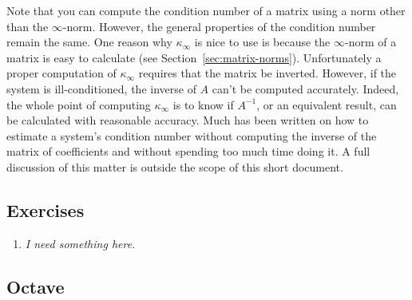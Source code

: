Note that you can compute the condition number of a matrix using a norm other than the
$\infty$-norm. However, the general properties of the condition number remain the same. One
reason why $\kappa_\infty$ is nice to use is because the $\infty$-norm of a matrix is easy to
calculate (see Section~\ref{sec:matrix-norms}). Unfortunately a proper computation of
$\kappa_\infty$ requires that the matrix be inverted. However, if the system is ill-conditioned,
the inverse of $A$ can't be computed accurately. Indeed, the whole point of computing
$\kappa_\infty$ is to know if $A^{-1}$, or an equivalent result, can be calculated with
reasonable accuracy. Much has been written on how to estimate a system's condition number
without computing the inverse of the matrix of coefficients and without spending too much time
doing it. A full discussion of this matter is outside the scope of this short document.

\subsection*{Exercises}

\begin{enumerate}

\item \emph{I need something here.}

\end{enumerate}

\subsection*{Octave}
